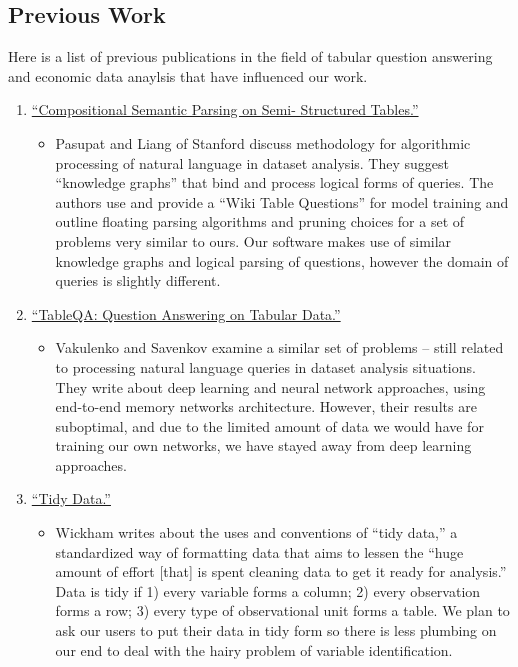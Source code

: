 \documentclass[pageno]{jpaper}
\begin{document}
\subsection{Previous Work }
Here is a list of previous publications in the field of tabular question answering and economic data anaylsis that have influenced our work.
\begin{enumerate}
	\item   \href{https://doi.org/10.3115/v1/P15-1142} {“Compositional Semantic Parsing on Semi-
Structured Tables.”}
	\begin{itemize}
		\item  Pasupat and Liang of Stanford discuss methodology for algorithmic processing of natural
language in dataset analysis. They suggest “knowledge graphs” that bind and process logical forms of queries. The authors use and provide a “Wiki Table Questions” for model training and outline floating parsing algorithms and pruning choices for a set of problems very similar to ours. Our software makes use of similar knowledge graphs and logical parsing of questions, however the domain of queries is slightly different.  \\
	\end{itemize}
	\item  \href{http://ceur-ws.org/Vol-2044/paper1/paper1.html}{“TableQA: Question Answering on
Tabular Data.”} 
	\begin{itemize}
		\item Vakulenko and Savenkov examine a similar set of problems – still related to processing natural language queries in dataset analysis situations. They write about deep learning and neural network approaches, using end-to-end memory networks architecture. However, their results are suboptimal, and due to the limited amount of data we would have for training our own networks, we have stayed away from deep learning approaches.\\
	\end{itemize}
	\item \href{ jstatsoft.org}{“Tidy Data.”}
	\begin{itemize}
		\item Wickham writes about the uses and conventions of “tidy data,” a standardized way of formatting data that aims to lessen the “huge amount of effort [that] is spent cleaning data to get it ready for analysis.” Data is tidy if 1) every variable forms a column; 2) every observation forms a row; 3) every type of observational unit forms a table. We plan to ask our users to put their data in tidy form so there is less plumbing on our end to deal with the hairy problem of variable identification.\\

\end{itemize}
\end{enumerate}
\end{document}
